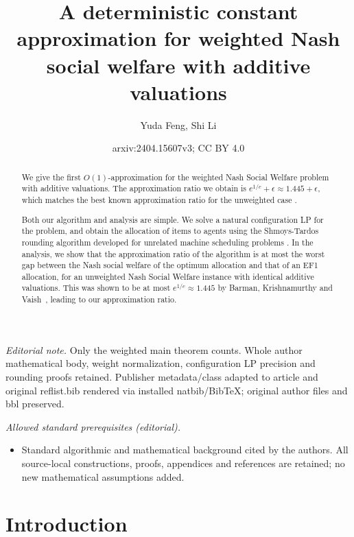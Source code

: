 \documentclass[10pt,a4paper]{article}
\title{A deterministic constant approximation for weighted Nash social welfare with additive valuations}
\author{Yuda Feng, Shi Li}
\date{arxiv:2404.15607v3; CC BY 4.0}
\theoremstyle{definition}
\theoremstyle{plain}
\begin{document}
\maketitle
\noindent\textit{Editorial note.} Only the weighted main theorem counts. Whole author mathematical body, weight normalization, configuration LP precision and rounding proofs retained. Publisher metadata/class adapted to article and original reflist.bib rendered via installed natbib/BibTeX; original author files and bbl preserved.\par\medskip
\noindent\textit{Allowed standard prerequisites (editorial).}\begin{itemize}
\item Standard algorithmic and mathematical background cited by the authors. All source-local constructions, proofs, appendices and references are retained; no new mathematical assumptions added.
\end{itemize}\medskip
\begin{abstract}
    We give the first $O(1)$-approximation for the weighted Nash Social Welfare problem with additive valuations. The approximation ratio we obtain is $e^{1/e} + \epsilon \approx 1.445 + \epsilon$, which matches the best known approximation ratio for the unweighted case \cite{BKV18}.  
    
    Both our algorithm and analysis are simple. We solve a natural configuration LP for the problem, and obtain the allocation of items to agents using the Shmoys-Tardos rounding algorithm developed for  unrelated machine scheduling problems \cite{ST93}. In the analysis, we show that the approximation ratio of the algorithm is at most the worst gap between the Nash social welfare of the optimum allocation and that of an EF1 allocation, for an unweighted Nash Social Welfare instance with identical additive valuations. This was shown to be at most $e^{1/e} \approx 1.445$ by Barman, Krishnamurthy and Vaish\ \cite{BKV18}, leading to our approximation ratio. 
\end{abstract}

 


\section{Introduction}
\end{document}
